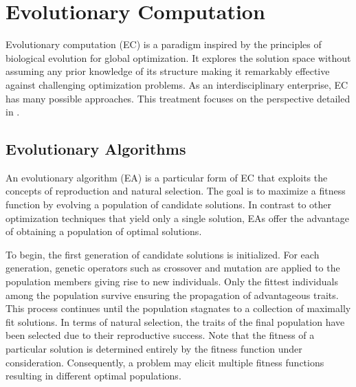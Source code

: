 \documentclass[12pt]{report}
\begin{document}
 
 
 
 
\section{Evolutionary Computation}
Evolutionary computation (EC) is a paradigm inspired by the principles of biological evolution for global optimization. It explores the solution space without assuming any prior knowledge of its structure making it remarkably effective against challenging optimization problems. As an interdisciplinary enterprise, EC has many possible approaches. This treatment focuses on the perspective detailed in \citet{ashlock2010}. 





\subsection{Evolutionary Algorithms}
An evolutionary algorithm (EA) is a particular form of EC that exploits the concepts of reproduction and natural selection. The goal is to maximize a fitness function by evolving a population of candidate solutions. In contrast to other optimization techniques that yield only a single solution, EAs offer the advantage of obtaining a population of optimal solutions. 

To begin, the first generation of candidate solutions is initialized. For each generation, genetic operators such as crossover and mutation are applied to the population members giving rise to new individuals. Only the fittest individuals among the population survive ensuring the propagation of advantageous traits. This process continues until the population stagnates to a collection of maximally fit solutions.  In terms of natural selection, the traits of the final population have been selected due to their reproductive success. Note that the fitness of a particular solution is determined entirely by the fitness function under consideration. Consequently, a problem may elicit multiple fitness functions resulting in different optimal populations. 




\end{document}
